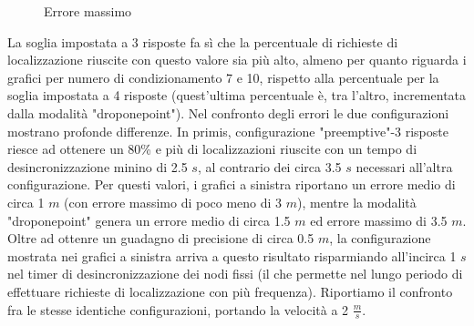 \documentclass[Lau,binding=0.6cm]{sapthesis}
\begin{document}
\begin{figure}[H]
    \centering
    \hfill
    \caption{Errore massimo}
\end{figure}
La soglia impostata a 3 risposte fa sì che la percentuale di richieste di localizzazione riuscite con questo valore sia più alto, almeno per quanto riguarda i grafici per numero di condizionamento 7 e 10, rispetto alla percentuale per la soglia impostata a 4 risposte (quest'ultima percentuale è, tra l'altro, incrementata dalla modalità "droponepoint").
Nel confronto degli errori le due configurazioni mostrano profonde differenze. In primis, configurazione "preemptive"-3 risposte riesce ad ottenere un 80\% e più di localizzazioni riuscite con un tempo di desincronizzazione minino di 2.5 $s$, al contrario dei circa 3.5 $s$ necessari all'altra configurazione. Per questi valori, i grafici a sinistra riportano un errore medio di circa 1 $m$ (con errore massimo di poco meno di 3 $m$), mentre la modalità "droponepoint" genera un errore medio di circa 1.5 $m$ ed errore massimo di 3.5 $m$.
Oltre ad ottenre un guadagno di precisione di circa 0.5 $m$, la configurazione mostrata nei grafici a sinistra arriva a questo risultato risparmiando all'incirca 1 $s$ nel timer di desincronizzazione dei nodi fissi (il che permette nel lungo periodo di effettuare richieste di localizzazione con più frequenza).
Riportiamo il confronto fra le stesse identiche configurazioni, portando la velocità a 2 $\frac{m}{s}$.
\end{document}
